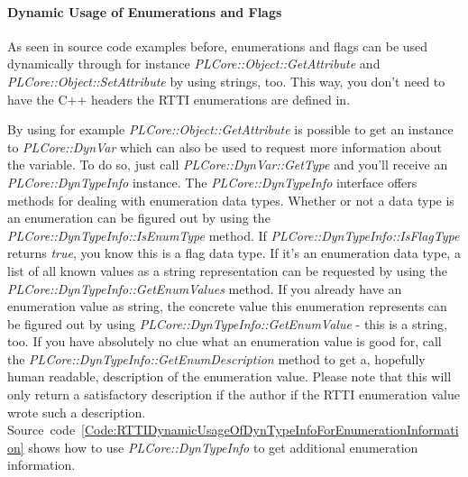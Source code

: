 \paragraph{Dynamic Usage of Enumerations and Flags}
As seen in source code examples before, enumerations and flags can be used dynamically through for instance \emph{PLCore::Object::GetAttribute} and \emph{PLCore::Object::SetAttribute} by using strings, too. This way, you don't need to have the C++ headers the \ac{RTTI} enumerations are defined in.

By using for example \emph{PLCore::Object::GetAttribute} is possible to get an instance to \emph{PLCore::DynVar} which can also be used to request more information about the variable. To do so, just call \emph{PLCore::DynVar::GetType} and you'll receive an \emph{PLCore::DynTypeInfo} instance. The \emph{PLCore::DynTypeInfo} interface offers methods for dealing with enumeration data types. Whether or not a data type is an enumeration can be figured out by using the \emph{PLCore::DynTypeInfo::IsEnumType} method. If \emph{PLCore::DynTypeInfo::IsFlagType} returns \emph{true}, you know this is a flag data type. If it's an enumeration data type, a list of all known values as a string representation can be requested by using the \emph{PLCore::DynTypeInfo::GetEnumValues} method. If you already have an enumeration value as string, the concrete value this enumeration represents can be figured out by using \emph{PLCore::DynTypeInfo::GetEnumValue} - this is a string, too. If you have absolutely no clue what an enumeration value is good for, call the \emph{PLCore::DynTypeInfo::GetEnumDescription} method to get a, hopefully human readable, description of the enumeration value. Please note that this will only return a satisfactory description if the author if the \ac{RTTI} enumeration value wrote such a description. Source~code~\ref{Code:RTTIDynamicUsageOfDynTypeInfoForEnumerationInformation} shows how to use \emph{PLCore::DynTypeInfo} to get additional enumeration information.
